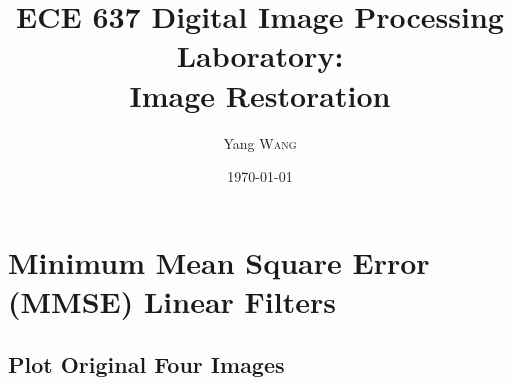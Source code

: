 \documentclass{article}
\title{ECE 637 Digital Image Processing Laboratory: \\ Image 
Restoration} %
\author{Yang \textsc{Wang}} %
\date{\today} %
\begin{document}
\maketitle %

\section{Minimum Mean Square Error (MMSE) Linear Filters}

\subsection{Plot Original Four Images}
\end{document}
